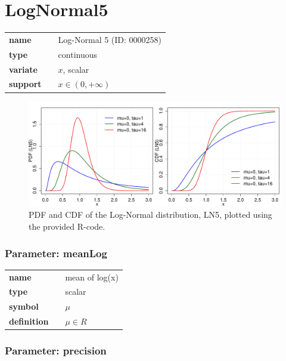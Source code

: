 \smallskip\section*{LogNormal5} 

  \bigskip 

\begin{tabular}{p{2cm}cl}
\textbf{name} & & Log-Normal 5 (ID: 0000258)\\ 
 
\textbf{type} & & continuous \\ 

\textbf{variate} & & $x$, scalar \\ 

\textbf{support} & & $x \in (0,+\infty)$
\end{tabular}

\begin{figure}[htb!]
\centering
  \includegraphics[width=140mm]{pics/LogNormal5_pdf_cdf.pdf}
 \caption{PDF and CDF of the Log-Normal distribution, LN5,
 plotted using the provided R-code.}
 \label{fig:LN5pdfcdf}
\end{figure}

\subsubsection*{Parameter: meanLog}

\noindent\begin{tabular}{p{2cm}cl}
\textbf{name} & & mean of log(x) \\
\textbf{type} & & scalar \\
\textbf{symbol} & & $\mu$  \\
\textbf{definition} & & $\mu \in R$
\end{tabular}
\subsubsection*{Parameter: precision}

